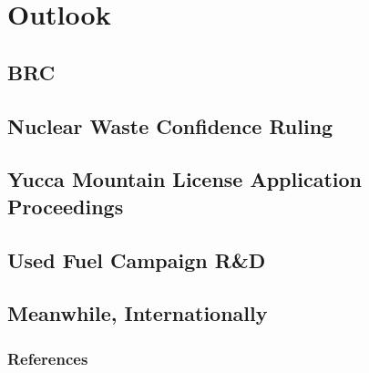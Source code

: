 \documentclass{beamer}
\begin{document}
\section{Outlook}
\subsection{BRC}

\subsection{Nuclear Waste Confidence Ruling}

\subsection{Yucca Mountain License Application Proceedings}

\subsection{Used Fuel Campaign R\&D}

\subsection{Meanwhile, Internationally}







\begin{frame}[allowframebreaks]
  \frametitle{References}
  
  {\footnotesize  }

\end{frame}

\end{document}
